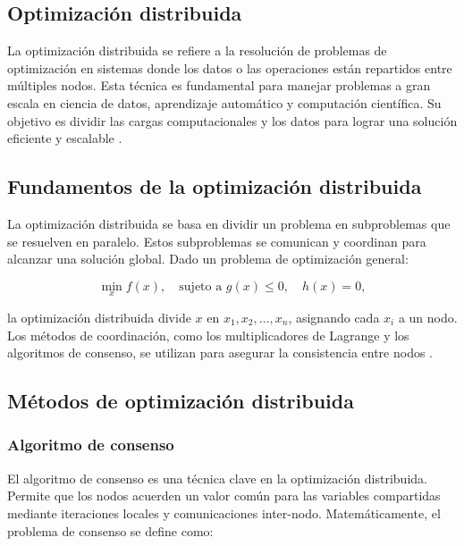 \begin{itemize}
		\section{Optimización distribuida}
		
		La optimización distribuida se refiere a la resolución de problemas de optimización en sistemas donde los datos o las operaciones están repartidos entre múltiples nodos. Esta técnica es fundamental para manejar problemas a gran escala en ciencia de datos, aprendizaje automático y computación científica. Su objetivo es dividir las cargas computacionales y los datos para lograr una solución eficiente y escalable \cite{boyd2011distributed}.
		
		\subsection{Fundamentos de la optimización distribuida}
		
		La optimización distribuida se basa en dividir un problema en subproblemas que se resuelven en paralelo. Estos subproblemas se comunican y coordinan para alcanzar una solución global. Dado un problema de optimización general:
		
		\begin{equation}
			\min_x f(x), \quad \text{sujeto a } g(x) \leq 0, \quad h(x) = 0,
		\end{equation}
		
		la optimización distribuida divide \(x\) en \(x_1, x_2, \dots, x_n\), asignando cada \(x_i\) a un nodo. Los métodos de coordinación, como los multiplicadores de Lagrange y los algoritmos de consenso, se utilizan para asegurar la consistencia entre nodos \cite{nocedal1999optimization}.
		
		\subsection{Métodos de optimización distribuida}
		
		\subsubsection{Algoritmo de consenso}
		
		El algoritmo de consenso es una técnica clave en la optimización distribuida. Permite que los nodos acuerden un valor común para las variables compartidas mediante iteraciones locales y comunicaciones inter-nodo. Matemáticamente, el problema de consenso se define como:
		

\end{itemize}
